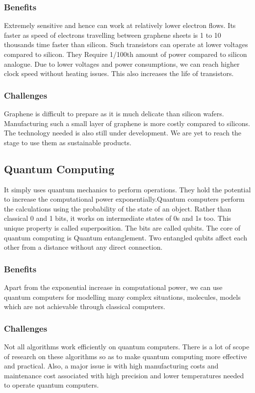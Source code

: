 \documentclass{article}
\begin{document}
        \subsubsection{Benefits}
        Extremely sensitive and hence can work at relatively lower electron flows. Its faster as speed of electrons travelling between graphene sheets is 1 to 10 thousands time faster than silicon.
        Such transistors can operate at lower voltages compared to silicon. They Require 1/100th amount of power compared to silicon analogue. Due to lower voltages and power consumptions, we can reach higher clock speed without heating issues. This also increases the life of transistors.
        \subsubsection{Challenges}
       Graphene is difficult to prepare as it is much delicate than silicon wafers. Manufacturing such a small layer of graphene is more costly compared to silicons. The technology needed is also still under development. We are yet to reach the stage to use them as sustainable products.
    \subsection{Quantum Computing}
        It simply uses quantum mechanics to perform operations. They hold the potential to increase the computational power exponentially.Quantum computers perform the calculations using the probability of the state of an object. Rather than classical 0 and 1 bits, it works on intermediate states of 0s and 1s too. This unique property is called superposition. The bits are called qubits. The core of quantum computing is Quantum entanglement. Two entangled qubits affect each other from a distance without any direct connection.
        \subsubsection{Benefits}
        Apart from the exponential increase in computational power, we can use quantum computers for modelling many complex situations, molecules, models which are not achievable through classical computers. 
        \subsubsection{Challenges}
        Not all algorithms work efficiently on quantum computers. There is a lot of scope of research on these algorithms so as to make quantum computing more effective and practical. Also, a major issue is with high manufacturing costs and maintenance cost associated with high precision and lower temperatures needed to operate quantum computers.
\end{document}
